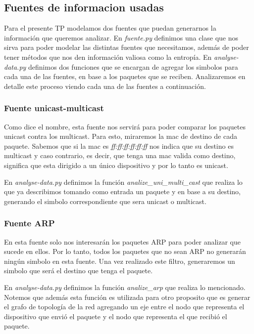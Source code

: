 \subsection{Fuentes de informacion usadas}

Para el presente TP modelamos dos fuentes que puedan generarnos la informaci\'on que queremos analizar. En \textit{fuente.py} definimos una clase que nos sirva para poder modelar las distintas fuentes que necesitamos, adem\'as de poder tener m\'etodos que nos den informaci\'on valiosa como la entrop\'ia. En \textit{analyse-data.py} definimos dos funciones que se encargan de agregar los simbolos para cada una de las fuentes, en base a los paquetes que se reciben. Analizaremos en detalle este proceso viendo cada una de las fuentes a continuaci\'on.

\subsubsection{Fuente unicast-multicast}

Como dice el nombre, esta fuente nos servir\'a para poder comparar los paquetes unicast contra los multicast. Para esto, miraremos la mac de destino de cada paquete. Sabemos que si la mac es \textit{ff:ff:ff:ff:ff:ff} nos indica que su destino es multicast y caso contrario, es decir, que tenga una mac valida como destino, significa que esta dirigido a un \'unico dispositivo y por lo tanto es unicast.

En \textit{analyse-data.py} definimos la funci\'on \textit{analize\_uni\_multi\_cast} que realiza lo que ya describimos tomando como entrada un paquete y en base a su destino, generando el simbolo correspondiente que sera unicast o multicast.


\subsubsection{Fuente ARP}

En esta fuente solo nos interesar\'an los paquetes ARP para poder analizar que sucede en ellos. Por lo tanto, todos los paquetes que no sean ARP no generar\'an ning\'un simbolo en esta fuente. Una vez realizado este filtro, generaremos un simbolo que ser\'a el destino que tenga el paquete.

En \textit{analyse-data.py} definimos la funci\'on \textit{analize\_arp} que realiza lo mencionado. Notemos que adem\'as esta funci\'on es utilizada para otro proposito que es generar el grafo de topolog\'ia de la red agregando un eje entre el nodo que representa el dispositivo que envi\'o el paquete y el nodo que representa el que recibi\'o el paquete.